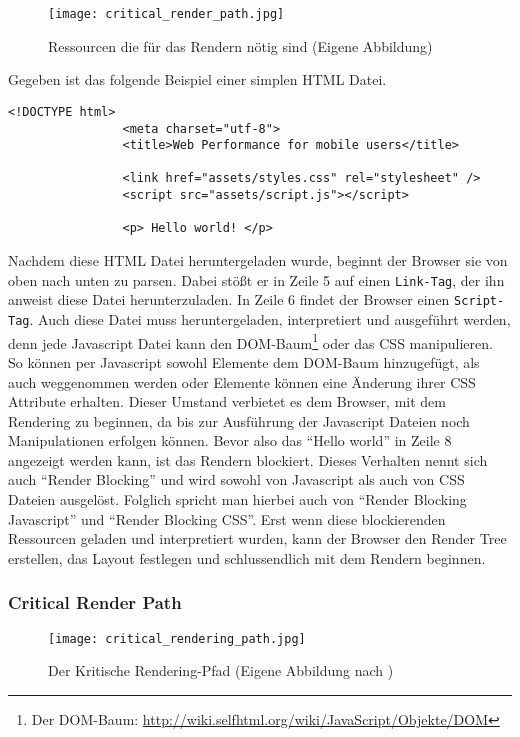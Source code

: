 			\begin{figure}[htbp]
				\begin{center}
					\texttt{[image: critical\_render\_path.jpg]}
					\caption{Ressourcen die für das Rendern nötig sind (Eigene Abbildung)}
					\label{fig:critical_render_path}
				\end{center}
			\end{figure}

			Gegeben ist das folgende Beispiel einer simplen HTML Datei.

			\begin{lstlisting}[captionpos=b, caption=Beispiel Code, label=beispielCode]
				<!DOCTYPE html>
				<meta charset="utf-8">
				<title>Web Performance for mobile users</title>

				<link href="assets/styles.css" rel="stylesheet" />
				<script src="assets/script.js"></script>

				<p> Hello world! </p>

			\end{lstlisting}

			Nachdem diese HTML Datei heruntergeladen wurde, beginnt der Browser sie von oben nach unten zu parsen. Dabei stößt er in Zeile 5 auf einen \texttt{Link-Tag}, der ihn anweist diese Datei herunterzuladen. In Zeile 6 findet der Browser einen \texttt{Script-Tag}. Auch diese Datei muss heruntergeladen, interpretiert und ausgeführt werden, denn jede Javascript Datei kann den DOM-Baum\footnote{Der DOM-Baum: \url{http://wiki.selfhtml.org/wiki/JavaScript/Objekte/DOM}} oder das CSS manipulieren. So können per Javascript sowohl Elemente dem DOM-Baum hinzugefügt, als auch weggenommen werden oder Elemente können eine Änderung ihrer CSS Attribute erhalten. Dieser Umstand verbietet es dem Browser, mit dem Rendering zu beginnen, da bis zur Ausführung der Javascript Dateien noch Manipulationen erfolgen können.
			Bevor also das "`Hello world"' in Zeile 8 angezeigt werden kann, ist das Rendern blockiert. Dieses Verhalten nennt sich auch "`Render Blocking"' und wird sowohl von Javascript als auch von CSS Dateien ausgelöst. Folglich spricht man hierbei auch von "`Render Blocking Javascript"' und "`Render Blocking CSS"'. Erst wenn diese blockierenden Ressourcen geladen und interpretiert wurden, kann der Browser den Render Tree erstellen, das Layout festlegen und schlussendlich mit dem Rendern beginnen. 



		\subsubsection{Critical Render Path} %
		\label{ssub:critical_render_path}
			\begin{figure}[htbp]
				\begin{center}
					\texttt{[image: critical\_rendering\_path.jpg]}
					\caption{Der Kritische Rendering-Pfad (Eigene Abbildung nach \autocite[p. 3]{santana14})}
					\label{fig:critical_rendering_path}
				\end{center}
			\end{figure}
			
